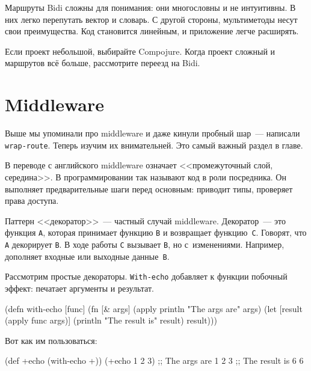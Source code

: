 Маршруты Bidi сложны для понимания: они многословны и не интуитивны. В них легко
перепутать вектор и словарь. С другой стороны, мультиметоды несут свои
преимущества. Код становится линейным, и приложение легче расширять.

Если проект небольшой, выбирайте Compojure. Когда проект сложный и маршрутов всё
больше, рассмотрите переезд на Bidi.

\section{Middleware}


Выше мы упоминали про middleware и даже кинули пробный шар~--- написали
\verb|wrap-route|. Теперь изучим их внимательней. Это самый важный раздел в
главе.

В переводе с английского middleware означает <<промежуточный слой, середина>>. В
программировании так называют код в роли посредника. Он выполняет
предварительные шаги перед основным: приводит типы, проверяет права доступа.

\label{decorator}


Паттерн <<декоратор>>~--- частный случай middleware. Декоратор~--- это функция
\verb|А|, которая принимает функцию \verb|B| и возвращает
функцию~\verb|C|. Говорят, что \verb|A| декорирует \verb|B|. В ходе работы
\verb|C| вызывает \verb|B|, но с~изменениями. Например, дополняет входные
или выходные данные~\verb|B|.

Рассмотрим простые декораторы. \verb|With-echo| добавляет к функции побочный
эффект: печатает аргументы и результат.

\begin{english}
  \begin{clojure}
(defn with-echo [func]
  (fn [& args]
    (apply println "The args are" args)
    (let [result (apply func args)]
      (println "The result is" result)
      result)))
  \end{clojure}
\end{english}

Вот как им пользоваться:

\begin{english}
  \begin{clojure}
(def +echo (with-echo +))
(+echo 1 2 3)
;; The args are 1 2 3
;; The result is 6
6
  \end{clojure}
\end{english}


